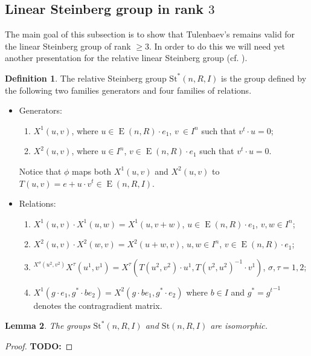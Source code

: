 \documentclass[oneside,12pt]{amsart}
\numberwithin{equation}{section}
\newtheorem{lem}{Lemma}
\numberwithin{lem}{section}
\theoremstyle{definition}
\newtheorem{dfn}[lem]{Definition}
\theoremstyle{remark}
\DeclareMathOperator{\EE}{E}
\newcommand{\Stb}{\mathrm{St}}
\begin{document}
\begin{appendices}

\section{Linear Steinberg group in rank $3$}

The main goal of this subsection is to show that Tulenbaev's \cite[Lemma~2.3]{Tu} remains valid for the linear Steinberg group of rank $\geq 3$.
In order to do this we will need yet another presentation for the relative linear Steinberg group (cf. \cite[Definitions~3.3 and 3.7]{S15}).
\begin{dfn}
 The relative Steinberg group $\Stb^*(n,R, I)$ is the group defined by the following two
 families generators and four families of relations.
 \begin{itemize}
  \item Generators:
  \begin{enumerate}
  \item $X^1(u, v)$, where $u \in \EE(n,R) \cdot e_1$, $v\ \in I^n$ such that $v^t \cdot u = 0$;
  \item $X^2(u, v)$, where $u \in I^n$, $v \in \EE(n,R) \cdot e_1$ such that $v^t \cdot u = 0$.
 \end{enumerate}
  Notice that $\phi$ maps both $X^1(u, v)$ and $X^2(u, v)$ to $T(u, v) = e + u \cdot v^t \in \EE(n, R, I)$.
  \item Relations:
  \begin{enumerate}
  \item $X^1(u, v) \cdot X^1(u, w) = X^1(u, v+w)$, $u \in \EE(n,R) \cdot e_1$, $v, w \in I^n$;
  \item $X^2(u, v) \cdot X^2(w, v) = X^2(u+w, v)$, $u, w \in I^n$, $v \in \EE(n,R) \cdot e_1$;
  \item ${}^{X^\sigma(u^2, v^2)} \! X^\tau(u^1, v^1) = X^\tau(T(u^2, v^2) \cdot u^1, T(v^2, u^2)^{-1} \cdot v^1)$, $\sigma, \tau = 1,2$;
  \item $X^1(g \cdot e_1, g^* \cdot be_2) = X^2(g \cdot be_1, g^* \cdot e_2)$ where $b\in I$ and $g^* = {g^t}^{-1}$ denotes the contragradient matrix.
 \end{enumerate}
 \end{itemize}
\end{dfn}

\begin{lem}
 The groups $\Stb^*(n, R, I)$ and $\Stb(n, R, I)$ are isomorphic.
\end{lem}
\begin{proof}
 {\bf TODO:}
\end{proof}


\end{appendices}
\end{document}
